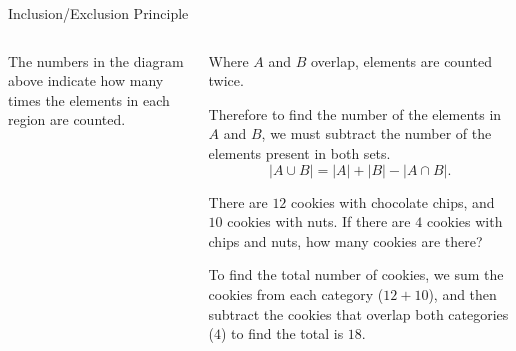 \documentclass[9pt,aspectratio=169]{beamer}
\begin{document}
\begin{frame}{Inclusion/Exclusion Principle}
\begin{columns}[T]
\begin{column}{0.5\textwidth}
\begin{columns}[totalwidth=0.8\textwidth]
\begin{column}{0.45\textwidth}
\begin{center}
          \end{center}
        \end{column}
      \end{columns}
      \vspace*{-0.5\baselineskip}
      The numbers in the diagram above indicate how many times the elements in each region are counted.
    \end{column}
    \begin{column}{0.5\textwidth}
      Where $A$ and $B$ overlap, elements are counted twice. 
      \begin{definition}
        Therefore to find the number of the elements in $A$ and $B$, we must subtract the number of the elements present in both sets. 
        \[ |A \cup B| = |A| + |B| - |A \cap B|. \]
        \vspace*{-0.9\baselineskip}
      \end{definition}
      \begin{problem}
        There are $12$ cookies with chocolate chips, and $10$ cookies with nuts.  If there are $4$ cookies with chips and nuts, how many cookies are there?
      \end{problem}
      To find the total number of cookies, we sum the cookies from each category ($12 + 10$), and then subtract the cookies that overlap both categories ($4$) to find the total is $18$.
    \end{column}
  \end{columns}
\end{frame}
\end{document}
